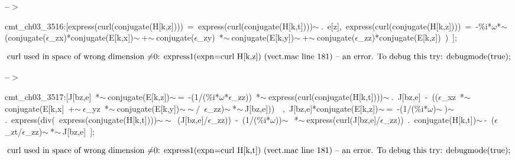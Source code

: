 \documentclass[fleqn]{article}
\begin{document}
\noindent
\begin{minipage}[t]{4.000000em}\color{red}\bfseries
 --\ensuremath{\ensuremath{>}}	
\end{minipage}
\begin{minipage}[t]{\textwidth}\color{blue}
cmt\_ch03\_3516:[express(curl(conjugate(H[k,z])))\ =\ express(curl(conjugate(H[k,t])))\ensuremath{\sim\ }.\ e[z],\ express(curl(conjugate(H[k,z])))\ =\ -\%i*\ensuremath{\omega}*\ensuremath{\sim\ }(conjugate(\ensuremath{\epsilon}\_zx)*conjugate(E[k,x])\ensuremath{\sim\ }+\ensuremath{\sim\ }conjugate(\ensuremath{\epsilon}\_zy)\ *\ensuremath{\sim\ }conjugate(E[k,y])\ensuremath{\sim\ }+\ensuremath{\sim\ }conjugate(\ensuremath{\epsilon}\_zz)*conjugate(E[k,z])\ )\ ];
\end{minipage}
\[\displaystyle \mbox{%
curl used in space of wrong dimension
}\mbox{%
\ensuremath{\neq}0: express1(expn=curl H[k,z]) (vect.mac line 181)
}\mbox{%
 -- an error. To debug this try: debugmode(true);}\mbox{}
\]


\noindent
\begin{minipage}[t]{4.000000em}\color{red}\bfseries
 --\ensuremath{\ensuremath{>}}	
\end{minipage}
\begin{minipage}[t]{\textwidth}\color{blue}
cmt\_ch03\_3517:[J[bz,e]\ *\ensuremath{\sim\ }conjugate(E[k,z])\ensuremath{\sim\ }=\ -(1/(\%i*\ensuremath{\omega}*\ensuremath{\epsilon}\_zz))\ *\ensuremath{\sim\ }express(curl(conjugate(H[k,t])))\ensuremath{\sim\ }.\ J[bz,e]\ -\ ((\ensuremath{\epsilon}\_xz\ *\ensuremath{\sim\ }conjugate(E[k,x]\ +\ensuremath{\sim\ }\ensuremath{\epsilon}\_yz\ *\ensuremath{\sim\ }conjugate(E[k,y])\ensuremath{\sim\ }\ensuremath{\sim\ }/\ \ensuremath{\epsilon}\_zz)\ensuremath{\sim\ }*\ensuremath{\sim\ }J[bz,e]))\ \ ,\ J[bz,e]*conjugate(E[k,z])\ensuremath{\sim\ }=\ -(1/(\%i*\ensuremath{\omega})\ensuremath{\sim\ })\ensuremath{\sim\ }.\ express(div(\ express(conjugate(H[k,t])))\ensuremath{\sim\ }\ensuremath{\sim\ }\ (J[bz,e]/\ensuremath{\epsilon}\_zz))\ -\ (1/(\%i*\ensuremath{\omega}))\ensuremath{\sim\ }\ *\ensuremath{\sim\ }express(curl(J[bz,e]/\ensuremath{\epsilon}\_zz))\ .\ conjugate(H[k,t])\ensuremath{\sim\ }-\ (\ensuremath{\epsilon}\_zt/\ensuremath{\epsilon}\_zz)\ensuremath{\sim\ }*\ensuremath{\sim\ }J[bz,e]\ ];
\end{minipage}
\[\displaystyle \mbox{%
curl used in space of wrong dimension
}\mbox{%
\ensuremath{\neq}0: express1(expn=curl H[k,t]) (vect.mac line 181)
}\mbox{%
 -- an error. To debug this try: debugmode(true);}\mbox{}
\]
\end{document}
